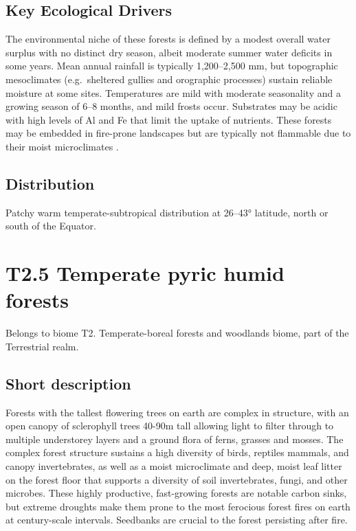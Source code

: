 \documentclass[
  letterpaper,
  DIV=11,
  numbers=noendperiod]{scrartcl}
\begin{document}
\subsection{Key Ecological Drivers}\label{key-ecological-drivers-76}

The environmental niche of these forests is defined by a modest overall
water surplus with no distinct dry season, albeit moderate summer water
deficits in some years. Mean annual rainfall is typically 1,200--2,500
mm, but topographic mesoclimates (e.g.~sheltered gullies and orographic
processes) sustain reliable moisture at some sites. Temperatures are
mild with moderate seasonality and a growing season of 6--8 months, and
mild frosts occur. Substrates may be acidic with high levels of Al and
Fe that limit the uptake of nutrients. These forests may be embedded in
fire-prone landscapes but are typically not flammable due to their moist
microclimates .

\subsection{Distribution}\label{distribution-76}

Patchy warm temperate-subtropical distribution at 26--43° latitude,
north or south of the Equator.

\section{T2.5 Temperate pyric humid
forests}\label{t2.5-temperate-pyric-humid-forests}

Belongs to biome T2. Temperate-boreal forests and woodlands biome, part
of the Terrestrial realm.

\subsection{Short description}\label{short-description-77}

Forests with the tallest flowering trees on earth are complex in
structure, with an open canopy of sclerophyll trees 40-90m tall allowing
light to filter through to multiple understorey layers and a ground
flora of ferns, grasses and mosses. The complex forest structure
sustains a high diversity of birds, reptiles mammals, and canopy
invertebrates, as well as a moist microclimate and deep, moist leaf
litter on the forest floor that supports a diversity of soil
invertebrates, fungi, and other microbes. These highly productive,
fast-growing forests are notable carbon sinks, but extreme droughts make
them prone to the most ferocious forest fires on earth at century-scale
intervals. Seedbanks are crucial to the forest persisting after fire.
\end{document}
